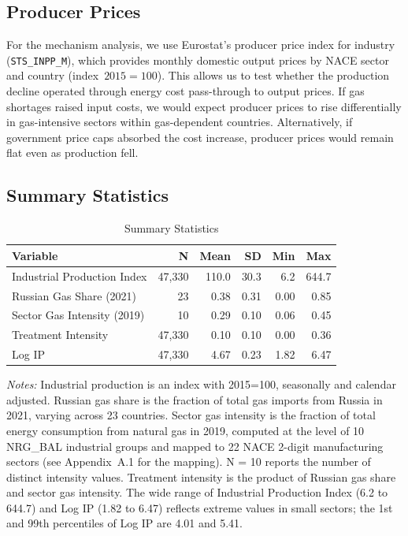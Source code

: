 \documentclass[12pt]{article}
\begin{document}
\subsection{Producer Prices}

For the mechanism analysis, we use Eurostat's producer price index for industry (\texttt{STS\_INPP\_M}), which provides monthly domestic output prices by NACE sector and country (index~$2015=100$). This allows us to test whether the production decline operated through energy cost pass-through to output prices. If gas shortages raised input costs, we would expect producer prices to rise differentially in gas-intensive sectors within gas-dependent countries. Alternatively, if government price caps absorbed the cost increase, producer prices would remain flat even as production fell.

\subsection{Summary Statistics}

\begin{table}[H]
\centering
\caption{Summary Statistics}
\label{tab:summary}
\begin{threeparttable}
\begin{tabular}{lrrrrr}
\toprule
Variable & N & Mean & SD & Min & Max \\
\midrule
Industrial Production Index & 47,330 & 110.0 & 30.3 & 6.2 & 644.7 \\
Russian Gas Share (2021) & 23 & 0.38 & 0.31 & 0.00 & 0.85 \\
Sector Gas Intensity (2019) & 10 & 0.29 & 0.10 & 0.06 & 0.45 \\
Treatment Intensity & 47,330 & 0.10 & 0.10 & 0.00 & 0.36 \\
Log IP & 47,330 & 4.67 & 0.23 & 1.82 & 6.47 \\
\bottomrule
\end{tabular}
\begin{tablenotes}[flushleft]
\small
\item \textit{Notes:} Industrial production is an index with 2015=100, seasonally and calendar adjusted. Russian gas share is the fraction of total gas imports from Russia in 2021, varying across 23 countries. Sector gas intensity is the fraction of total energy consumption from natural gas in 2019, computed at the level of 10 NRG\_BAL industrial groups and mapped to 22 NACE 2-digit manufacturing sectors (see Appendix~A.1 for the mapping). N = 10 reports the number of distinct intensity values. Treatment intensity is the product of Russian gas share and sector gas intensity. The wide range of Industrial Production Index (6.2 to 644.7) and Log IP (1.82 to 6.47) reflects extreme values in small sectors; the 1st and 99th percentiles of Log IP are 4.01 and 5.41.
\end{tablenotes}
\end{threeparttable}
\end{table}
\end{document}
